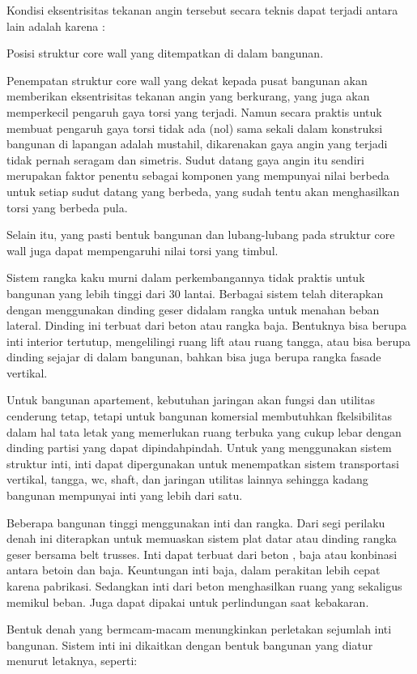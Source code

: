 \documentclass[../modul_skb.tex]{subfiles}
\begin{document}
Kondisi eksentrisitas tekanan angin tersebut secara teknis dapat terjadi antara lain adalah karena :

\tabitem Posisi struktur core wall yang ditempatkan di dalam bangunan.

Penempatan struktur core wall yang dekat kepada pusat bangunan akan memberikan eksentrisitas tekanan angin yang berkurang, yang juga akan memperkecil pengaruh gaya torsi yang terjadi. Namun secara praktis untuk membuat pengaruh gaya torsi tidak ada (nol) sama sekali dalam konstruksi bangunan di lapangan adalah mustahil, dikarenakan gaya angin yang terjadi tidak pernah seragam dan simetris. Sudut datang gaya angin itu sendiri merupakan faktor penentu sebagai komponen yang mempunyai nilai berbeda untuk setiap sudut datang yang berbeda, yang sudah tentu akan menghasilkan torsi yang berbeda pula.

Selain itu, yang pasti bentuk bangunan dan lubang-lubang pada struktur core wall juga dapat mempengaruhi nilai torsi yang timbul.

Sistem rangka kaku murni dalam perkembangannya tidak praktis untuk bangunan yang lebih tinggi dari 30 lantai. Berbagai sistem telah diterapkan dengan menggunakan dinding geser didalam rangka untuk menahan beban lateral. Dinding ini terbuat dari beton atau rangka baja. Bentuknya bisa berupa inti interior tertutup, mengelilingi ruang lift atau ruang tangga, atau bisa berupa dinding sejajar di dalam bangunan, bahkan bisa juga berupa rangka fasade vertikal.

Untuk bangunan apartement, kebutuhan jaringan akan fungsi dan utilitas cenderung tetap, tetapi untuk bangunan komersial membutuhkan fkelsibilitas dalam hal tata letak yang memerlukan ruang terbuka yang cukup lebar dengan dinding partisi yang dapat dipindahpindah. Untuk yang menggunakan sistem struktur inti, inti dapat dipergunakan untuk menempatkan sistem transportasi vertikal, tangga, wc, shaft, dan jaringan utilitas lainnya sehingga kadang bangunan mempunyai inti yang lebih dari satu.

Beberapa bangunan tinggi menggunakan inti dan rangka. Dari segi perilaku denah ini diterapkan untuk memuaskan sistem plat datar atau dinding rangka geser bersama belt trusses. Inti dapat terbuat dari beton , baja atau konbinasi antara betoin dan baja. Keuntungan inti baja, dalam perakitan lebih cepat karena pabrikasi. Sedangkan inti dari beton menghasilkan ruang yang sekaligus memikul beban. Juga dapat dipakai untuk perlindungan saat kebakaran.

Bentuk denah yang bermcam-macam menungkinkan perletakan sejumlah inti bangunan. Sistem inti ini dikaitkan dengan bentuk bangunan yang diatur menurut letaknya, seperti:
\end{document}
